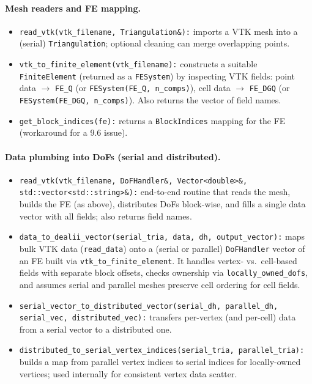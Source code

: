 \documentclass[a4paper,12pt]{article}
\begin{document}
\paragraph{Mesh readers and FE mapping.}
\begin{itemize}
  \item \texttt{read\_vtk(vtk\_filename, Triangulation\&):}
        imports a VTK mesh into a (serial) \texttt{Triangulation}; optional
        cleaning can merge overlapping points.
  \item \texttt{vtk\_to\_finite\_element(vtk\_filename):}
        constructs a suitable \texttt{FiniteElement} (returned as a
        \texttt{FESystem}) by inspecting VTK fields:
        point data $\rightarrow$ \texttt{FE\_Q} (or \texttt{FESystem(FE\_Q, n\_comps)}),
        cell data $\rightarrow$ \texttt{FE\_DGQ} (or \texttt{FESystem(FE\_DGQ, n\_comps)}).
        Also returns the vector of field names.
  \item \texttt{get\_block\_indices(fe):}
        returns a \texttt{BlockIndices} mapping for the FE (workaround for a 9.6 issue).
\end{itemize}

\paragraph{Data plumbing into DoFs (serial and distributed).}
\begin{itemize}
  \item {\footnotesize \texttt{read\_vtk(vtk\_filename, DoFHandler\&, Vector<double>\&, std::vector<std::string>\&):}}
        end-to-end routine that reads the mesh, builds the FE (as above),
        distributes DoFs block-wise, and fills a single data vector with all
        fields; also returns field names.
  \item \texttt{data\_to\_dealii\_vector(serial\_tria, data, dh, output\_vector):}
        maps bulk VTK data (\texttt{read\_data}) onto a (serial or parallel)
        \texttt{DoFHandler} vector of an FE built via \texttt{vtk\_to\_finite\_element}.
        It handles vertex- vs.\ cell-based fields with separate block offsets,
        checks ownership via \texttt{locally\_owned\_dofs}, and assumes serial
        and parallel meshes preserve cell ordering for cell fields.
  \item \texttt{serial\_vector\_to\_distributed\_vector(serial\_dh, parallel\_dh, serial\_vec, distributed\_vec):}
        transfers per-vertex (and per-cell) data from a serial vector to a
        distributed one.
  \item \texttt{distributed\_to\_serial\_vertex\_indices(serial\_tria, parallel\_tria):}
        builds a map from parallel vertex indices to serial indices for
        locally-owned vertices; used internally for consistent vertex data scatter.
\end{itemize}
\end{document}
